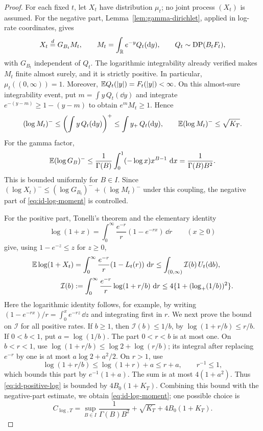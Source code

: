 \begin{proof}
For each fixed $t$, let $X_t$ have distribution $\mu_t$; no joint process $(X_t)$ is assumed.
For the negative part, Lemma~\ref{lem:gamma-dirichlet}, applied in log-rate coordinates, gives
\[
 X_t\overset{d}=G_{B_t}M_t,\qquad
 M_t=\int_\mathbb R e^{-y}Q_t(\mathop{}\!\mathrm d y),\qquad
 Q_t\sim\operatorname{DP}(B_tF_t),
\]
with $G_{B_t}$ independent of $Q_t$.
The logarithmic integrability already verified makes $M_t$ finite almost surely, and it is strictly positive.
In particular, $\mu_t((0,\infty))=1$.
Moreover, $\mathbb E Q_t(|y|)=F_t(|y|)<\infty$.
On this almost-sure integrability event, put $m=\int y\,Q_t(\dd y)$ and integrate $e^{-(y-m)}\ge1-(y-m)$ to obtain $e^mM_t\ge1$.
Hence
\[
 (\log M_t)^-\le\left(\int y\,Q_t(\mathop{}\!\mathrm d y)\right)^+
 \le\int y_+\,Q_t(\mathop{}\!\mathrm d y),
 \qquad \mathbb E(\log M_t)^-\le\sqrt{K_T}.
\]
For the gamma factor,
\[
 \mathbb E(\log G_B)^-
 \le\frac1{\Gamma(B)}\int_0^1(-\log x)x^{B-1}\,\mathop{}\!\mathrm d x
 =\frac1{\Gamma(B)B^2}.
\]
This is bounded uniformly for $B\in I$.
Since $(\log X_t)^-\le(\log G_{B_t})^-+(\log M_t)^-$ under this coupling, the negative part of \eqref{eq:id-log-moment} is controlled.

For the positive part, Tonelli's theorem and the elementary identity
\[
 \log(1+x)=\int_0^\infty\frac{e^{-r}}r(1-e^{-rx})\,\dd r
 \qquad (x\ge0)
\]
give, using $1-e^{-z}\le z$ for $z\ge0$,
\begin{equation}
 \begin{aligned}
 \mathbb E\log(1+X_t)
 &=\int_0^\infty\frac{e^{-r}}r(1-L_t(r))\,\mathop{}\!\mathrm d r
 \le\int_{(0,\infty)}\mathcal{I}(b)\,U_t(\mathop{}\!\mathrm d b),\\
 \mathcal{I}(b)&:=\int_0^\infty\frac{e^{-r}}r\log(1+r/b)\,\mathop{}\!\mathrm d r
 \le4\{1+(\log_+(1/b))^2\}.
 \end{aligned}
 \label{eq:id-positive-log}
\end{equation}
Here the logarithmic identity follows, for example, by writing $(1-e^{-rx})/r=\int_0^x e^{-rz}\,\dd z$ and integrating first in $r$.
We next prove the bound on $\mathcal{I}$ for all positive rates.
If $b\ge1$, then $\mathcal{I}(b)\le1/b$, by $\log(1+r/b)\le r/b$.
If $0<b<1$, put $a=\log(1/b)$.
The part $0<r<b$ is at most one.
On $b<r<1$, use $\log(1+r/b)\le\log2+\log(r/b)$; its integral after replacing $e^{-r}$ by one is at most $a\log2+a^2/2$.
On $r>1$, use
\[
 \log(1+r/b)\le\log(1+r)+a\le r+a,\qquad r^{-1}\le1,
\]
which bounds this part by $e^{-1}(1+a)$.
The sum is at most $4(1+a^2)$.
Thus \eqref{eq:id-positive-log} is bounded by $4B_0(1+K_T)$.
Combining this bound with the negative-part estimate, we obtain \eqref{eq:id-log-moment}; one possible choice is
\[
 C_{\log,T}=
 \sup_{B\in I}\frac1{\Gamma(B)B^2}
 +\sqrt{K_T}+4B_0(1+K_T).
\]


\end{proof}
